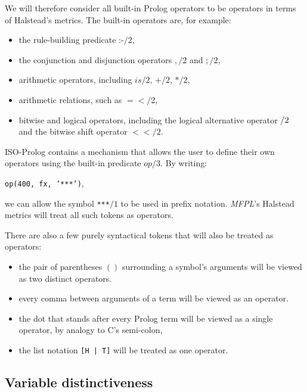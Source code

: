 \documentclass[11pt,a4paper,twoside]{article}
\newcommand{\pname}{\emph{MFPL}}
\begin{document}
\begin{multicols}{2}
We will therefore consider all built-in Prolog operators to be
operators in terms of Halstead's metrics. The built-in operators are,
for example:
\begin{itemize}
\item the rule-building predicate :-$/2$,
\item the conjunction and disjunction operators $,/2$ and $;/2$,
\item arithmetic operators, including $is/2$, $+/2$, $*/2$, 
\item arithmetic relations, such as $=</2$, 
\item bitwise and logical operators, including the logical alternative
  operator $\//2$ and the bitwise shift operator $<</2$.
\end{itemize}

ISO-Prolog contains a mechanism that allows the user to define their
own operators using the built-in predicate $op/3$. By writing: 
\begin{center}
\texttt{op(400, fx, '***')},
\end{center}
 we can allow the symbol \texttt{***}$/1$ to be used in prefix
notation. \pname's Halstead metrics will treat all such tokens as
operators.

There are also a few purely syntactical tokens that will also be
treated as operators:
\begin{itemize}
\item the pair of parentheses $()$ surrounding a symbol's arguments
  will be viewed as two distinct operators.
\item every comma between arguments of a term will be viewed as an
  operator.
\item the dot that stands after every Prolog term will be viewed as a
  single operator, by analogy to C's semi-colon,
\item the list notation \texttt{[H | T]} will be treated as one
  operator.
\end{itemize}

\subsection{Variable distinctiveness}


\end{multicols}
\end{document}
